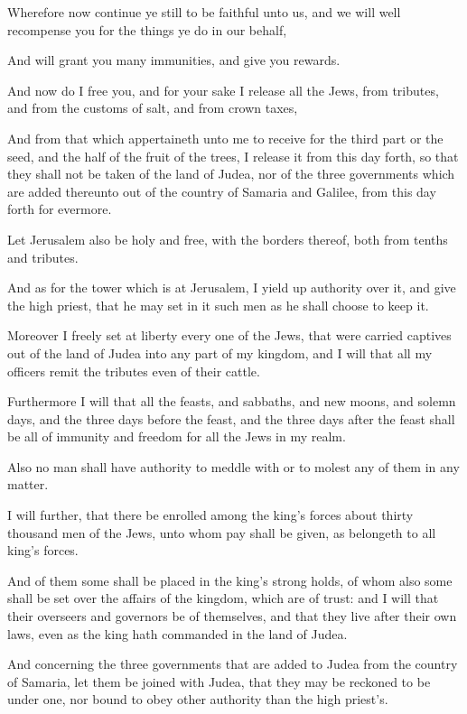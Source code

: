 {\par }{\PP {}Wherefore now continue ye still to be faithful unto us, and we will well recompense you for the things ye do in our behalf,
\par }{\PP {}And will grant you many immunities, and give you rewards.
\par }{\PP {}And now do I free you, and for your sake I release all the Jews, from tributes, and from the customs of salt, and from crown taxes,
\par }{\PP {}And from that which appertaineth unto me to receive for the third part or the seed, and the half of the fruit of the trees, I release it from this day forth, so that they shall not be taken of the land of Judea, nor of the three governments which are added thereunto out of the country of Samaria and Galilee, from this day forth for evermore.
\par }{\PP {}Let Jerusalem also be holy and free, with the borders thereof, both from tenths and tributes.
\par }{\PP {}And as for the tower which is at Jerusalem, I yield up authority over it, and give the high priest, that he may set in it such men as he shall choose to keep it.
\par }{\PP {}Moreover I freely set at liberty every one of the Jews, that were carried captives out of the land of Judea into any part of my kingdom, and I will that all my officers remit the tributes even of their cattle.
\par }{\PP {}Furthermore I will that all the feasts, and sabbaths, and new moons, and solemn days, and the three days before the feast, and the three days after the feast shall be all of immunity and freedom for all the Jews in my realm.
\par }{\PP {}Also no man shall have authority to meddle with or to molest any of them in any matter.
\par }{\PP {}I will further, that there be enrolled among the king’s forces about thirty thousand men of the Jews, unto whom pay shall be given, as belongeth to all king’s forces.
\par }{\PP {}And of them some shall be placed in the king’s strong holds, of whom also some shall be set over the affairs of the kingdom, which are of trust: and I will that their overseers and governors be of themselves, and that they live after their own laws, even as the king hath commanded in the land of Judea.
\par }{\PP {}And concerning the three governments that are added to Judea from the country of Samaria, let them be joined with Judea, that they may be reckoned to be under one, nor bound to obey other authority than the high priest’s.
}
